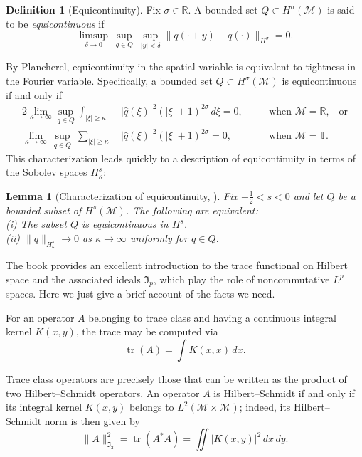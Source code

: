 \documentclass{amsart}
\newcommand{\I}{{\mathfrak{I}}}
\newcommand{\R}{{\mathbb{R}}}
\newcommand{\T}{{\mathbb{T}}}
\DeclareMathOperator{\tr}{tr}
\newtheorem{lemma}[theorem]{Lemma}
\theoremstyle{definition}
\newtheorem{definition}[theorem]{Definition}
\theoremstyle{remark}
\begin{document}
\begin{definition}[Equicontinuity]\label{d:equicontinuity}
Fix $\sigma\in \R$. A bounded set \(Q\subset H^\sigma(\mathcal M)\) is said to be \emph{equicontinuous} if
\[
\limsup_{\delta\to0} \ \sup_{q\in Q} \ \sup_{|y|<\delta}\|q(\cdot +y) - q(\cdot)\|_{H^\sigma} = 0.
\]
\end{definition}

By Plancherel, equicontinuity in the spatial variable is equivalent to tightness in the Fourier variable. Specifically, a bounded set $Q\subset H^\sigma(\mathcal M)$ is equicontinuous if and only if
\begin{alignat*}{2}
\lim_{ \kappa\to\infty}\sup_{q\in Q}\int_{|\xi|\geq \kappa} & |\widehat{q}(\xi)|^2 (|\xi|+1)^{2\sigma}\, d\xi =0,&\quad &\text{when $\mathcal M = \R$,} \quad\text{or}\\
\lim_{ \kappa\to\infty}\, \sup_{q\in Q}\ \sum_{|\xi|\geq \kappa} \ & |\widehat{q}(\xi)|^2 (|\xi|+1)^{2\sigma}=0,&\quad&\text{when $\mathcal M = \T$}.
\end{alignat*}
This characterization leads quickly to a description of equicontinuity in terms of the Sobolev spaces $H^s_\kappa$:

\begin{lemma}[Characterization of equicontinuity, {\cite[Lemma~2.4]{KLV}}]\label{L:equi}
Fix $-\frac12<s<0$ and let $Q$ be a bounded subset of $H^s(\mathcal M)$.  The following are equivalent:\\[1mm]
(i) The subset $Q$ is equicontinuous in $H^s$.\\[1mm]
(ii) $\|q\|_{H^s_\kappa} \to 0$ as $\kappa\to\infty$ uniformly for $q\in Q$.
\end{lemma}

The book \cite{MR2154153} provides an excellent introduction to the trace functional on Hilbert space and the associated ideals $\I_p$, which play the role of noncommutative $L^p$ spaces.  Here we just give a brief account of the facts we need.

For an operator $A$ belonging to trace class and having a continuous integral kernel $K(x,y)$, the trace may be computed via
\begin{equation}\label{trace}
\tr(A) = \int  K(x,x) \,dx.
\end{equation}

Trace class operators are precisely those that can be written as the product of two Hilbert--Schmidt operators.  An operator $A$ is Hilbert--Schmidt if and only if its integral kernel $K(x,y)$ belongs to $L^2(\mathcal M\times\mathcal M)$; indeed, its Hilbert--Schmidt norm is then given by
\begin{equation}\label{HS norm}
\| A \|_{\mathfrak I_2}^2 =  \tr(A^* A) = \iint | K(x,y)|^2 \,dx\,dy.
\end{equation}
\end{document}
